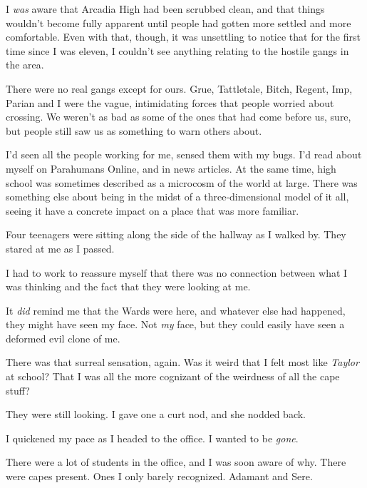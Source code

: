 I \emph{was} aware that Arcadia High had been scrubbed clean, and that things wouldn't become fully apparent until people had gotten more settled and more comfortable.  Even with that, though, it was unsettling to notice that for the first time since I was eleven, I couldn't see anything relating to the hostile gangs in the area.



There were no real gangs except for ours.  Grue, Tattletale, Bitch, Regent, Imp, Parian and I were the vague, intimidating forces that people worried about crossing.  We weren't as bad as some of the ones that had come before us, sure, but people still saw us as something to warn others about.



I'd seen all the people working for me, sensed them with my bugs.  I'd read about myself on Parahumans Online, and in news articles.  At the same time, high school was sometimes described as a microcosm of the world at large.  There was something else about being in the midst of a three-dimensional model of it all, seeing it have a concrete impact on a place that was more familiar.



Four teenagers were sitting along the side of the hallway as I walked by.  They stared at me as I passed.



I had to work to reassure myself that there was no connection between what I was thinking and the fact that they were looking at me.



It \emph{did} remind me that the Wards were here, and whatever else had happened, they might have seen my face.  Not \emph{my} face, but they could easily have seen a deformed evil clone of me.



There was that surreal sensation, again.  Was it weird that I felt most like \emph{Taylor} at school?  That I was all the more cognizant of the weirdness of all the cape stuff?



They were still looking.  I gave one a curt nod, and she nodded back.



I quickened my pace as I headed to the office.  I wanted to be \emph{gone}.



There were a lot of students in the office, and I was soon aware of why.  There were capes present.  Ones I only barely recognized.  Adamant and Sere.



